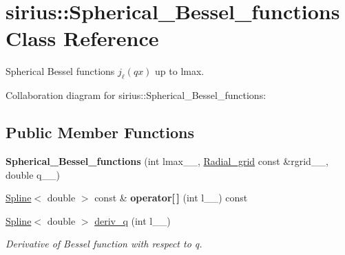 \hypertarget{classsirius_1_1_spherical___bessel__functions}{}\section{sirius\+:\+:Spherical\+\_\+\+Bessel\+\_\+functions Class Reference}
\label{classsirius_1_1_spherical___bessel__functions}


Spherical Bessel functions $ j_{\ell}(q x) $ up to lmax.  




Collaboration diagram for sirius\+:\+:Spherical\+\_\+\+Bessel\+\_\+functions\+:
\subsection*{Public Member Functions}
\begin{DoxyCompactItemize}
\item 
\hypertarget{classsirius_1_1_spherical___bessel__functions_afa32570f02e37eeb40b81831200f0c53}{}{\bfseries Spherical\+\_\+\+Bessel\+\_\+functions} (int lmax\+\_\+\+\_\+, \hyperlink{classsirius_1_1_radial__grid}{Radial\+\_\+grid} const \&rgrid\+\_\+\+\_\+, double q\+\_\+\+\_\+)\label{classsirius_1_1_spherical___bessel__functions_afa32570f02e37eeb40b81831200f0c53}

\item 
\hypertarget{classsirius_1_1_spherical___bessel__functions_aef22ded83580f614f49ef9eaa82fa5d5}{}\hyperlink{classsirius_1_1_spline}{Spline}$<$ double $>$ const \& {\bfseries operator\mbox{[}$\,$\mbox{]}} (int l\+\_\+\+\_\+) const \label{classsirius_1_1_spherical___bessel__functions_aef22ded83580f614f49ef9eaa82fa5d5}

\item 
\hyperlink{classsirius_1_1_spline}{Spline}$<$ double $>$ \hyperlink{classsirius_1_1_spherical___bessel__functions_aa36401fd1a8bf553440aa916a0fd1216}{deriv\+\_\+q} (int l\+\_\+\+\_\+)
\begin{DoxyCompactList}\small\item\em Derivative of Bessel function with respect to q. \end{DoxyCompactList}\end{DoxyCompactItemize}
